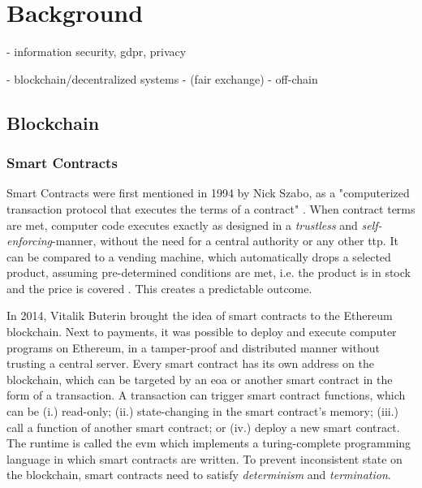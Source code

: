 \chapter{Background}
\label{cha:background}

- information security, gdpr, privacy

- blockchain/decentralized systems
- (fair exchange)
- off-chain

\section{Blockchain}
\label{sec:blockchain}

\subsection{Smart Contracts}
\label{subsec:sc}

Smart Contracts were first mentioned in 1994 by Nick Szabo, as a "computerized transaction protocol that executes the terms of a contract" \cite{Szabo_1997}. When contract terms are met, computer code executes exactly as designed in a \emph{trustless} and \emph{self-enforcing}-manner, without the need for a central authority or any other \acrshort{ttp}. It can be compared to a vending machine, which automatically drops a selected product, assuming pre-determined conditions are met, i.e. the product is in stock and the price is covered \cite{Szabo_1997}. This creates a predictable outcome.

In 2014, Vitalik Buterin \cite{buterinNEXTGENERATIONSMART} brought the idea of smart contracts to the Ethereum blockchain. Next to payments, it was possible to deploy and execute computer programs on Ethereum, in a tamper-proof and distributed manner without trusting a central server. Every smart contract has its own address on the blockchain, which can be targeted by an \acrfull{eoa} or another smart contract in the form of a transaction. A transaction can trigger smart contract functions, which can be (i.) read-only; (ii.) state-changing in the smart contract's memory; (iii.) call a function of another smart contract; or (iv.) deploy a new smart contract. The runtime is called the \acrfull{evm} which implements a turing-complete programming language in which smart contracts are written. To prevent inconsistent state on the blockchain, smart contracts need to satisfy \emph{determinism} and \emph{termination}.

